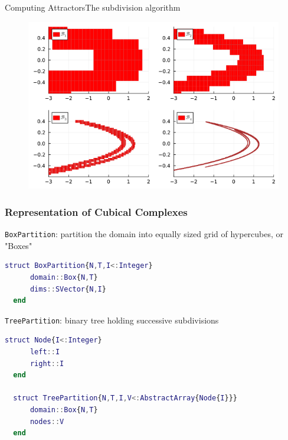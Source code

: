 \documentclass[
  english,            %
  aspectratio=169,    %
]{tumbeamer}
\begin{document}
\begin{frame}{Computing Attractors}{The subdivision algorithm}
  
\begin{figure}
  \includegraphics[height=0.8\textheight]{figures/henon_subdivisions}
\end{figure}

\end{frame}

\begin{frame}[fragile]
\frametitle{Representation of Cubical Complexes}

\texttt{BoxPartition}: partition the domain into equally sized grid of hypercubes, or "Boxes"

\begin{lstlisting}[language=Matlab,mathescape]
  struct BoxPartition{N,T,I<:Integer}
      domain::Box{N,T}
      dims::SVector{N,I}
  end
\end{lstlisting}

\texttt{TreePartition}: binary tree holding successive subdivisions

\begin{lstlisting}[language=Matlab,mathescape]
  struct Node{I<:Integer}
      left::I
      right::I
  end

  struct TreePartition{N,T,I,V<:AbstractArray{Node{I}}}
      domain::Box{N,T}
      nodes::V
  end
\end{lstlisting}

\end{frame}
\end{document}
